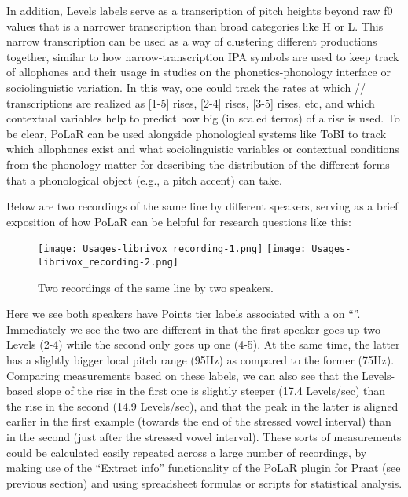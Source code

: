 In addition, Levels labels serve as a transcription of pitch heights beyond raw f0 values that is a narrower transcription than broad categories like H or L. This narrow transcription can be used as a way of clustering different productions together, similar to how narrow-transcription IPA symbols are used to keep track of allophones and their usage in studies on the phonetics-phonology interface or sociolinguistic variation. In this way, one could track the rates at which // transcriptions are realized as [1-5] rises, [2-4] rises, [3-5] rises, etc, and which contextual variables help to predict how big (in scaled terms) of a rise is used. To be clear, PoLaR can be used alongside phonological systems like ToBI to track which allophones exist and what sociolinguistic variables or contextual conditions from the phonology matter for describing the distribution of the different forms that a phonological object (e.g., a pitch accent) can take.

Below are two recordings of the same line by different speakers, serving as a brief exposition of how PoLaR can be helpful for research questions like this:

\begin{figure}[H]
\centering
%
\texttt{[image: Usages-librivox\_recording-1.png]} \texttt{[image: Usages-librivox\_recording-2.png]}
%
\caption{Two recordings of the same line by two speakers.%
\label{fig:Usages-librivox recording}%
}
\end{figure}

Here we see both speakers have Points tier labels associated with a \textlabel{*} on “”. Immediately we see the two are different in that the first speaker goes up two Levels (2-4) while the second only goes up one (4-5). At the same time, the latter has a slightly bigger local pitch range (95Hz) as compared to the former (75Hz). Comparing measurements based on these labels, we can also see that the Levels-based slope of the rise in the first one is slightly steeper (17.4 Levels/sec) than the rise in the second (14.9 Levels/sec), and that the peak in the latter is aligned earlier in the first example (towards the end of the stressed vowel interval) than in the second (just after the stressed vowel interval). These sorts of measurements could be calculated easily repeated across a large number of recordings, by making use of the “Extract info” functionality of the PoLaR plugin for Praat (see previous section) and using spreadsheet formulas or scripts for statistical analysis.

